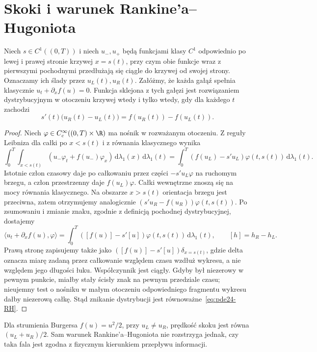 \section{Skoki i warunek Rankine'a--Hugoniota}
\begin{twierdzenie}
\label{thm:pde24-RH}
Niech $s\in C^1((0,T))$ i niech $u_-,u_+$ będą funkcjami
klasy $C^1$ odpowiednio po lewej i prawej stronie krzywej
$x=s(t)$, przy czym obie funkcje wraz z pierwszymi
pochodnymi przedłużają się ciągle do krzywej od swojej
strony. Oznaczamy ich ślady przez $u_L(t),u_R(t)$.
Załóżmy, że każda gałąź spełnia klasycznie
$u_t+\partial_xf(u)=0$. Funkcja sklejona z tych gałęzi
jest rozwiązaniem dystrybucyjnym w otoczeniu krzywej wtedy
i tylko wtedy, gdy dla każdego $t$ zachodzi
\begin{equation}\label{eq:pde24-RH}
 s'(t)\bigl(u_R(t)-u_L(t)\bigr)
 =f(u_R(t))-f(u_L(t)).
\end{equation}
\end{twierdzenie}
\begin{proof}
Niech $\varphi\in C_c^\infty((0,T)\times\R)$
ma nośnik w rozważanym otoczeniu. Z reguły Leibniza
dla całki po $x<s(t)$ i z równania klasycznego wynika
\[
 \int_0^T\!\int_{x<s(t)}(u_-\varphi_t+
 f(u_-)\varphi_x)\,\mathrm d\lambda_1(x)\,
 \mathrm d\lambda_1(t)
 =\int_0^T(f(u_L)-s'u_L)\varphi(t,s(t))\,
 \mathrm d\lambda_1(t).
\]
Istotnie człon czasowy daje po całkowaniu przez części
$-s'u_L\varphi$ na ruchomym brzegu, a człon przestrzenny
daje $f(u_L)\varphi$. Całki wewnętrzne znoszą się
na mocy równania klasycznego. Na obszarze $x>s(t)$
orientacja brzegu jest przeciwna, zatem otrzymujemy
analogicznie $(s'u_R-f(u_R))\varphi(t,s(t))$.
Po zsumowaniu i zmianie znaku, zgodnie z definicją
pochodnej dystrybucyjnej, dostajemy
\[
 \langle u_t+\partial_x f(u),\varphi\rangle
 =\int_0^T([f(u)]-s'[u])\varphi(t,s(t))\,
 \mathrm d\lambda_1(t),
 \qquad [h]=h_R-h_L.
\]
Prawą stronę zapisujemy także jako
$([f(u)]-s'[u])\delta_{x=s(t)}$, gdzie delta oznacza
miarę zadaną przez całkowanie względem czasu wzdłuż
wykresu, a nie względem jego długości łuku.
Współczynnik jest ciągły. Gdyby był niezerowy
w pewnym punkcie, miałby stały ścisły znak na pewnym
przedziale czasu; nieujemny test o nośniku
w małym otoczeniu odpowiedniego fragmentu wykresu
dałby niezerową całkę. Stąd znikanie dystrybucji
jest równoważne~\eqref{eq:pde24-RH}.
\end{proof}

Dla strumienia Burgersa $f(u)=u^2/2$, przy $u_L\ne u_R$,
prędkość skoku jest równa $(u_L+u_R)/2$. Sam warunek
Rankine'a--Hugoniota nie rozstrzyga jednak, czy taka fala
jest zgodna z fizycznym kierunkiem przepływu informacji.

